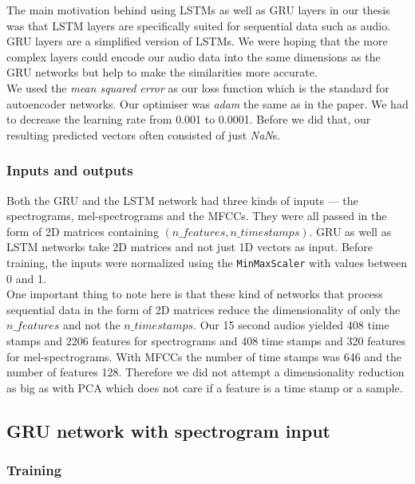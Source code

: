 The main motivation behind using LSTMs as well as GRU layers in our thesis was that LSTM layers are specifically suited for sequential data such as audio. GRU layers are a simplified version of LSTMs. We were hoping that the more complex layers could encode our audio data into the same dimensions as the GRU networks but help to make the similarities more accurate. \\

We used the \textit{mean squared error} as our loss function which is the standard for autoencoder networks. Our optimiser was \textit{adam} the same as in the \cite{inproceedings_RNNs} paper. We had to decrease the learning rate from 0.001 to 0.0001. Before we did that, our resulting predicted vectors often consisted of just \textit{NaN}s.

\subsubsection{Inputs and outputs}
Both the GRU and the LSTM network had three kinds of inputs --- the spectrograms, mel-spectrograms and the MFCCs. They were all passed in the form of 2D matrices containing $(n\_features, n\_timestamps)$. GRU as well as LSTM networks take 2D matrices and not just 1D vectors as input. Before training, the inputs were normalized using the \texttt{MinMaxScaler} with values between 0 and 1. \\
One important thing to note here is that these kind of networks that process sequential data in the form of 2D matrices reduce the dimensionality of only the $ n\_features $ and not the $ n\_timestamps $. Our 15 second audios yielded 408 time stamps and 2206 features for spectrograms and 408 time stamps and 320 features for mel-spectrograms. With MFCCs the number of time stamps was 646 and the number of features 128. Therefore we did not attempt a dimensionality reduction as big as with PCA which does not care if a feature is a time stamp or a sample.

\subsection{GRU network with spectrogram input}

\subsubsection{Training}

